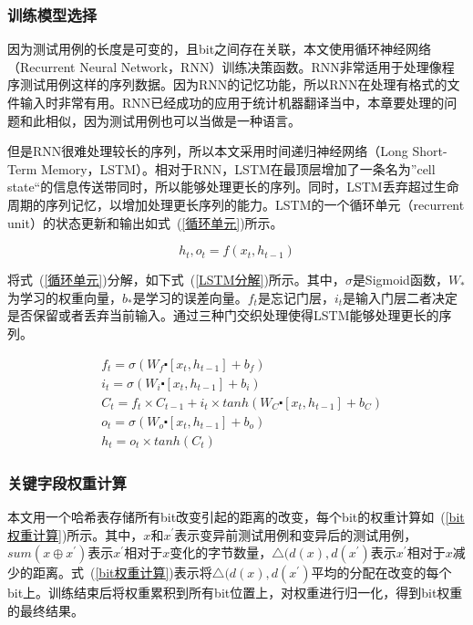 \subsubsection{训练模型选择}

因为测试用例的长度是可变的，且bit之间存在关联，本文使用循环神经网络（Recurrent Neural Network，RNN）训练决策函数。RNN非常适用于处理像程序测试用例这样的序列数据。因为RNN的记忆功能，所以RNN在处理有格式的文件输入时非常有用。RNN已经成功的应用于统计机器翻译当中，本章要处理的问题和此相似，因为测试用例也可以当做是一种语言。

但是RNN很难处理较长的序列，所以本文采用时间递归神经网络（Long Short-Term Memory，LSTM）。相对于RNN，LSTM在最顶层增加了一条名为”cell state“的信息传送带同时，所以能够处理更长的序列。同时，LSTM丢弃超过生命周期的序列记忆，以增加处理更长序列的能力。LSTM的一个循环单元（recurrent unit）的状态更新和输出如式~(\ref{循环单元})所示。

\begin{equation}\label{循环单元}
h_{t}, o_{t} = f(x_{t},h_{t-1})
\end{equation}

将式~(\ref{循环单元})分解，如下式~(\ref{LSTM分解})所示。其中，$\sigma$是Sigmoid函数，$W_{*}$为学习的权重向量，$b_{*}$是学习的误差向量。$f_t$是忘记门层，$i_t$是输入门层二者决定是否保留或者丢弃当前输入。通过三种门交织处理使得LSTM能够处理更长的序列。

\begin{equation}\label{LSTM分解}
\begin{aligned}
& f_{t} = \sigma(W_{f} \centerdot [x_{t}, h_{t-1}] + b_f) \\
& i_t = \sigma (W_{i} \centerdot [x_{t}, h_{t-1}] + b_{i}) \\
& C_{t} = f_{t} \times C_{t-1} + i_{t} \times tanh(W_C \centerdot [x_{t}, h_{t-1}] + b_{C}) \\
& o_t = \sigma(W_{o} \centerdot [x_{t}, h_{t-1}] + b_{o}) \\
& h_{t} = o_{t} \times tanh(C_{t})
\end{aligned}
\end{equation}

\subsubsection{关键字段权重计算}
\label{关键字段权重计算}

本文用一个哈希表存储所有bit改变引起的距离的改变，每个bit的权重计算如~(\ref{bit权重计算})所示。其中，$x$和$x^{'}$表示变异前测试用例和变异后的测试用例，$sum(x \oplus x^{'})$表示$x^{'}$相对于$x$变化的字节数量，$\bigtriangleup (d(x),d(x^{'})$表示$x^{'}$相对于$x$减少的距离。式~(\ref{bit权重计算})表示将$\bigtriangleup (d(x),d(x^{'})$平均的分配在改变的每个bit上。训练结束后将权重累积到所有bit位置上，对权重进行归一化，得到bit权重的最终结果。

